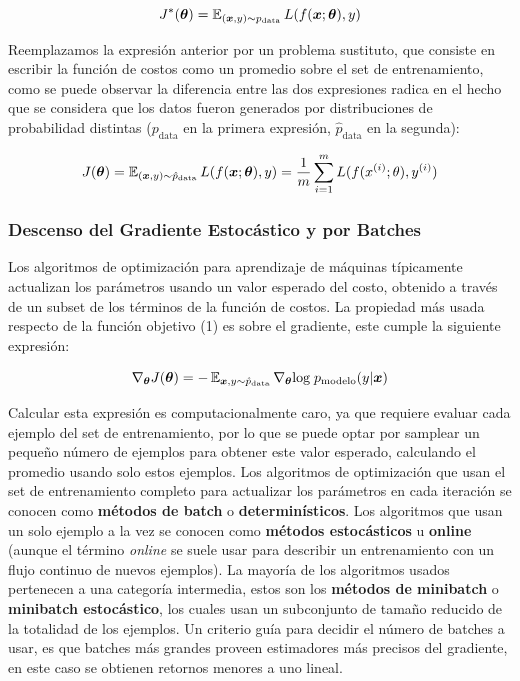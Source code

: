 \begin{equation}
J^{*}(\bm{\theta}) = \operatorname{\mathbb{E}}_{(\bm{x},y)\sim {p}_{\textrm{data}}}L(f(\bm{x};\bm{\theta}),y)
\label{gradiente_completo}
\end{equation}

Reemplazamos la expresión anterior por un problema sustituto, que consiste en escribir la funci\'on de costos como un promedio sobre el set de entrenamiento, como se puede observar la diferencia entre las dos expresiones radica en el hecho que se considera que los datos fueron generados por distribuciones de probabilidad distintas (${p}_{\textrm{data}}$ en la primera expresión, $\hat{p}_{\textrm{data}}$ en la segunda):

\begin{equation}
J(\bm{\theta}) = \operatorname{\mathbb{E}}_{(\bm{x},y)\sim \hat{p}_{\textrm{data}}}L(f(\bm{x};\bm{\theta}),y) = \frac{1}{m}\sum_{i=1}^m L(f(x^{(i)};\theta),y^{(i)})
\end{equation}

\subsubsection{Descenso del Gradiente Estoc\'astico y por Batches}

Los algoritmos de optimizaci\'on para aprendizaje de m\'aquinas t\'ipicamente actualizan los par\'ametros usando un valor esperado del costo, obtenido a trav\'es de un subset de los t\'erminos de la funci\'on de costos. La propiedad m\'as usada respecto de la funci\'on objetivo (1) es sobre el gradiente, este cumple la siguiente expresión:

\begin{equation}
\nabla_{\bm{\theta}}J(\bm{\theta}) = -\operatorname{\mathbb{E}}_{\bm{x},y\sim \hat{p}_{\textrm{data}}}\nabla_{\bm{\theta}}\textrm{log}\; p_{\textrm{modelo}}(y|\bm{x})
\end{equation}

Calcular esta expresi\'on es computacionalmente caro, ya que requiere evaluar cada ejemplo del set de entrenamiento, por lo que se puede optar por samplear un peque{\~{n}}o n\'umero de ejemplos para obtener este valor esperado, calculando el promedio usando solo estos ejemplos. Los algoritmos de optimizaci\'on que usan el set de entrenamiento completo para actualizar los par\'ametros en cada iteraci\'on se conocen como \textbf{m\'etodos de batch} o \textbf{determin\'isticos}. Los algoritmos que usan un solo ejemplo a la vez se conocen como \textbf{m\'etodos estoc\'asticos} u \textbf{online} (aunque el t\'ermino \textit{online} se suele usar para describir un entrenamiento con un flujo continuo de nuevos ejemplos). La mayor\'ia de los algoritmos usados pertenecen a una categor\'ia intermedia, estos son los \textbf{m\'etodos de minibatch} o \textbf{minibatch estoc\'astico}, los cuales usan un subconjunto de tamaño reducido de la totalidad de los ejemplos. Un criterio gu\'ia para decidir el n\'umero de batches a usar, es que batches m\'as grandes proveen estimadores m\'as precisos del gradiente, en este caso se obtienen retornos menores a uno lineal.

